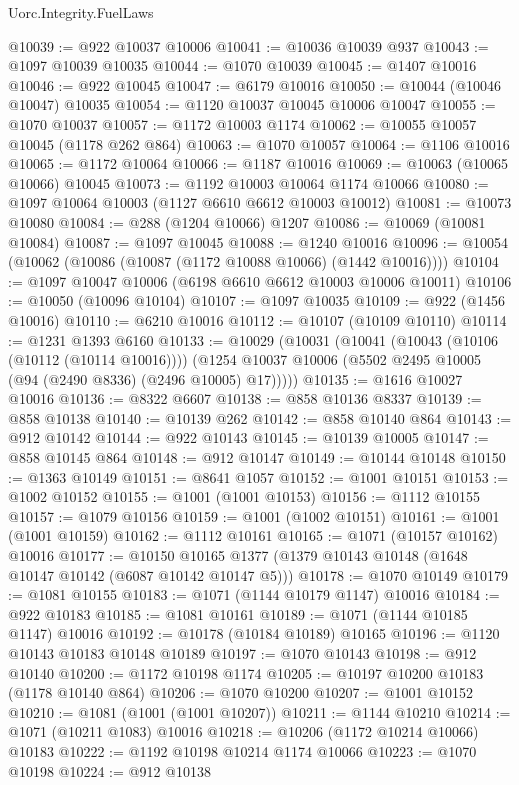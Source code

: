 \begin{lexlean}{Uorc.Integrity.FuelLaws}
\begin{coremodule}
@10039 := @922 @10037 @10006
@10041 := @10036 @10039 @937
@10043 := @1097 @10039 @10035
@10044 := @1070 @10039
@10045 := @1407 @10016
@10046 := @922 @10045
@10047 := @6179 @10016
@10050 := @10044 (@10046 @10047) @10035
@10054 := @1120 @10037 @10045 @10006 @10047
@10055 := @1070 @10037
@10057 := @1172 @10003 @1174
@10062 := @10055 @10057 @10045 (@1178 @262 @864)
@10063 := @1070 @10057
@10064 := @1106 @10016
@10065 := @1172 @10064
@10066 := @1187 @10016
@10069 := @10063 (@10065 @10066) @10045
@10073 := @1192 @10003 @10064 @1174 @10066
@10080 := @1097 @10064 @10003 (@1127 @6610 @6612 @10003 @10012)
@10081 := @10073 @10080
@10084 := @288 (@1204 @10066) @1207
@10086 := @10069 (@10081 @10084)
@10087 := @1097 @10045
@10088 := @1240 @10016
@10096 := @10054 (@10062 (@10086 (@10087 (@1172 @10088 @10066) (@1442 @10016))))
@10104 := @1097 @10047 @10006 (@6198 @6610 @6612 @10003 @10006 @10011)
@10106 := @10050 (@10096 @10104)
@10107 := @1097 @10035
@10109 := @922 (@1456 @10016)
@10110 := @6210 @10016
@10112 := @10107 (@10109 @10110)
@10114 := @1231 @1393 @6160
@10133 := @10029
    (@10031
      (@10041
        (@10043 (@10106 (@10112 (@10114 @10016))))
        (@1254 @10037 @10006 (@5502 @2495 @10005 (@94 (@2490 @8336) (@2496 @10005) @17)))))
@10135 := @1616 @10027 @10016
@10136 := @8322 @6607
@10138 := @858 @10136 @8337
@10139 := @858 @10138
@10140 := @10139 @262
@10142 := @858 @10140 @864
@10143 := @912 @10142
@10144 := @922 @10143
@10145 := @10139 @10005
@10147 := @858 @10145 @864
@10148 := @912 @10147
@10149 := @10144 @10148
@10150 := @1363 @10149
@10151 := @8641 @1057
@10152 := @1001 @10151
@10153 := @1002 @10152
@10155 := @1001 (@1001 @10153)
@10156 := @1112 @10155
@10157 := @1079 @10156
@10159 := @1001 (@1002 @10151)
@10161 := @1001 (@1001 @10159)
@10162 := @1112 @10161
@10165 := @1071 (@10157 @10162) @10016
@10177 := @10150 @10165 @1377 (@1379 @10143 @10148 (@1648 @10147 @10142 (@6087 @10142 @10147 @5)))
@10178 := @1070 @10149
@10179 := @1081 @10155
@10183 := @1071 (@1144 @10179 @1147) @10016
@10184 := @922 @10183
@10185 := @1081 @10161
@10189 := @1071 (@1144 @10185 @1147) @10016
@10192 := @10178 (@10184 @10189) @10165
@10196 := @1120 @10143 @10183 @10148 @10189
@10197 := @1070 @10143
@10198 := @912 @10140
@10200 := @1172 @10198 @1174
@10205 := @10197 @10200 @10183 (@1178 @10140 @864)
@10206 := @1070 @10200
@10207 := @1001 @10152
@10210 := @1081 (@1001 (@1001 @10207))
@10211 := @1144 @10210
@10214 := @1071 (@10211 @1083) @10016
@10218 := @10206 (@1172 @10214 @10066) @10183
@10222 := @1192 @10198 @10214 @1174 @10066
@10223 := @1070 @10198
@10224 := @912 @10138

\end{coremodule}
\end{lexlean}
